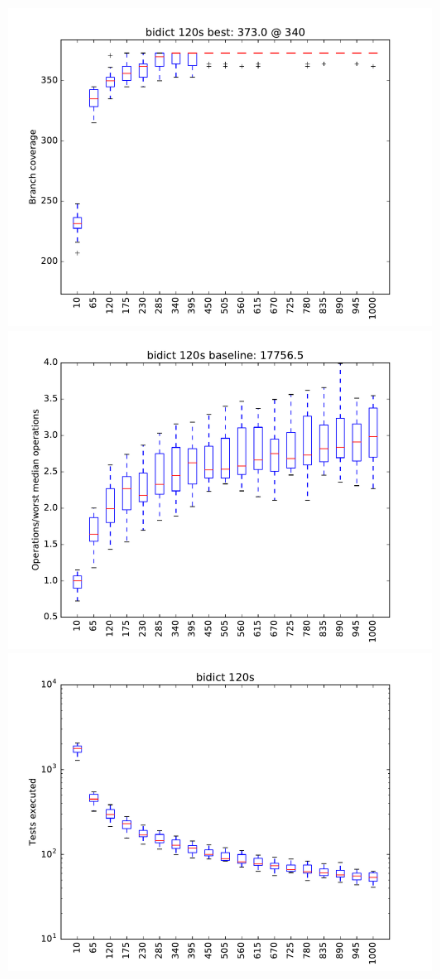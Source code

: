 \begin{figure}
\includegraphics[width=\columnwidth]{graphs/bidictrand120}
\includegraphics[width=\columnwidth]{graphs/opsbidictrand120}
\includegraphics[width=\columnwidth]{graphs/execbidictrand120}
\end{figure}


